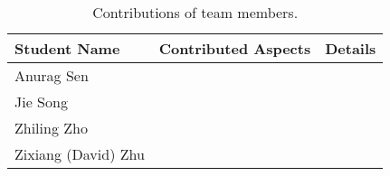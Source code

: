\documentclass[10pt,twocolumn,letterpaper]{article}
\begin{document}
\begin{table*}
\begin{center}
\begin{tabular}{|l|c|p{8cm}|}
\hline
Student Name & Contributed Aspects & Details \\
\hline\hline
Anurag Sen &  &  \\
Jie Song &  &  \\
Zhiling Zho &  &  \\
 Zixiang (David) Zhu &  & \\
\hline
\end{tabular}
\end{center}
\caption{Contributions of team members.}
\label{tab:contributions}
\end{table*}










\end{document}
